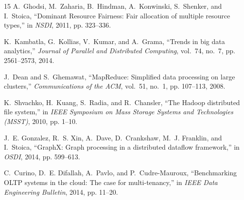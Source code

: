 \documentclass[10pt,journal,compsoc]{IEEEtran}
\begin{document}
\begin{thebibliography}{15}
A.~Ghodsi, M.~Zaharia, B.~Hindman, A.~Konwinski, S.~Shenker, and I.~Stoica, ``Dominant Resource Fairness: Fair allocation of multiple resource types,'' in \emph{NSDI}, 2011, pp. 323--336.

K.~Kambatla, G.~Kollias, V.~Kumar, and A.~Grama, ``Trends in big data analytics,'' \emph{Journal of Parallel and Distributed Computing}, vol.~74, no.~7, pp. 2561--2573, 2014.

J.~Dean and S.~Ghemawat, ``MapReduce: Simplified data processing on large clusters,'' \emph{Communications of the ACM}, vol.~51, no.~1, pp. 107--113, 2008.

K.~Shvachko, H.~Kuang, S.~Radia, and R.~Chansler, ``The Hadoop distributed file system,'' in \emph{IEEE Symposium on Mass Storage Systems and Technologies (MSST)}, 2010, pp. 1--10.

J.~E. Gonzalez, R.~S. Xin, A.~Dave, D.~Crankshaw, M.~J. Franklin, and I.~Stoica, ``GraphX: Graph processing in a distributed dataflow framework,'' in \emph{OSDI}, 2014, pp. 599--613.

C.~Curino, D.~E. Difallah, A.~Pavlo, and P.~Cudre-Mauroux, ``Benchmarking OLTP systems in the cloud: The case for multi-tenancy,'' in \emph{IEEE Data Engineering Bulletin}, 2014, pp. 11--20.
\end{thebibliography}
\end{document}
